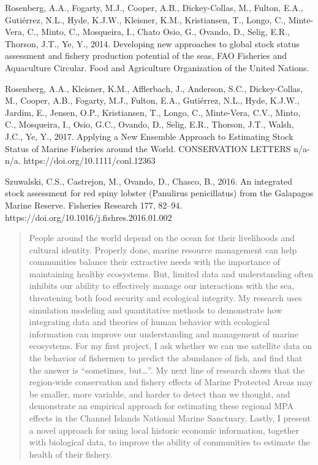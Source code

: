 \documentclass[twoside,12pt,final]{ucthesis-CA2012}
\begin{document}
\begin{ucfrontmatter}
\begin{vitae}
Rosenberg, A.A., Fogarty, M.J., Cooper, A.B., Dickey-Collas, M., Fulton, E.A., Gutiérrez, N.L., Hyde, K.J.W., Kleisner, K.M., Kristiansen, T., Longo, C., Minte-Vera, C., Minto, C., Mosqueira, I., Chato Osio, G., Ovando, D., Selig, E.R., Thorson, J.T., Ye, Y., 2014. Developing new approaches to global stock status assessment and fishery production potential of the seas, FAO Fisheries and Aquaculture Circular. Food and Agriculture Organization of the United Nations.

Rosenberg, A.A., Kleisner, K.M., Afflerbach, J., Anderson, S.C., Dickey-Collas, M., Cooper, A.B., Fogarty, M.J., Fulton, E.A., Gutiérrez, N.L., Hyde, K.J.W., Jardim, E., Jensen, O.P., Kristiansen, T., Longo, C., Minte-Vera, C.V., Minto, C., Mosqueira, I., Osio, G.C., Ovando, D., Selig, E.R., Thorson, J.T., Walsh, J.C., Ye, Y., 2017. Applying a New Ensemble Approach to Estimating Stock Status of Marine Fisheries around the World. CONSERVATION LETTERS n/a-n/a. https://doi.org/10.1111/conl.12363

Szuwalski, C.S., Castrejon, M., Ovando, D., Chasco, B., 2016. An integrated stock assessment for red spiny lobster (Panulirus penicillatus) from the Galapagos Marine Reserve. Fisheries Research 177, 82–94. https://doi.org/10.1016/j.fishres.2016.01.002


  \end{vitae}
  \begin{abstract}

    People around the world depend on the ocean for their livelihoods and
    cultural identity. Properly done, marine resource management can help
    communities balance their extractive needs with the importance of
    maintaining healthy ecosystems. But, limited data and understanding
    often inhibits our ability to effectively manage our interactions with
    the sea, threatening both food security and ecological integrity. My
    research uses simulation modeling and quantitative methods to
    demonstrate how integrating data and theories of human behavior with
    ecological information can improve our understanding and management of
    marine ecosystems. For my first project, I ask whether we can use
    satellite data on the behavior of fishermen to predict the abundance of
    fish, and find that the answer is ``sometimes, but\ldots{}''. My next
    line of research shows that the region-wide conservation and fishery
    effects of Marine Protected Areas may be smaller, more variable, and
    harder to detect than we thought, and demonstrate an empirical approach
    for estimating these regional MPA effects in the Channel Islands
    National Marine Sanctuary. Lastly, I present a novel approach for using
    local historic economic information, together with biological data, to
    improve the ability of communities to estimate the health of their
    fishery.

  \end{abstract}
	\tableofcontents
	  \listoftables
  
    \listoffigures
  \end{ucfrontmatter}
\end{document}
